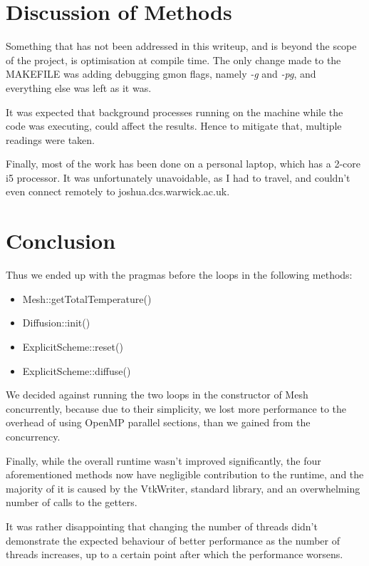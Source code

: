 \documentclass[11pt,journal]{IEEEtran}
\begin{document}
	\section{Discussion of Methods}
	Something that has not been addressed in this writeup, and is beyond the scope of the project, is optimisation at compile time. The only change made to the MAKEFILE was adding debugging gmon flags, namely \emph{-g} and \emph{-pg}, and everything else was left as it was.
	
	It was expected that background processes running on the machine while the code was executing, could affect the results. Hence to mitigate that, multiple readings were taken.
	
	Finally, most of the work has been done on a personal laptop, which has a 2-core i5 processor. It was unfortunately unavoidable, as I had to travel, and couldn't even connect remotely to joshua.dcs.warwick.ac.uk.
	
	
	\section{Conclusion}
	Thus we ended up with the pragmas before the loops in the following methods:
	\begin{itemize}
		\item Mesh::getTotalTemperature()
		\item Diffusion::init()
		\item ExplicitScheme::reset()
		\item ExplicitScheme::diffuse()
	\end{itemize}

	We decided against running the two loops in the constructor of Mesh concurrently, because due to their simplicity, we lost more performance to the overhead of using OpenMP parallel sections, than we gained from the concurrency.
	
	Finally, while the overall runtime wasn't improved significantly, the four aforementioned methods now have negligible contribution to the runtime, and the majority of it is caused by the VtkWriter, standard library, and an overwhelming number of calls to the getters.
	
	It was rather disappointing that changing the number of threads didn't demonstrate the expected behaviour of better performance as the number of threads increases, up to a certain point after which the performance worsens.
	
	
	
	
	
\end{document}
